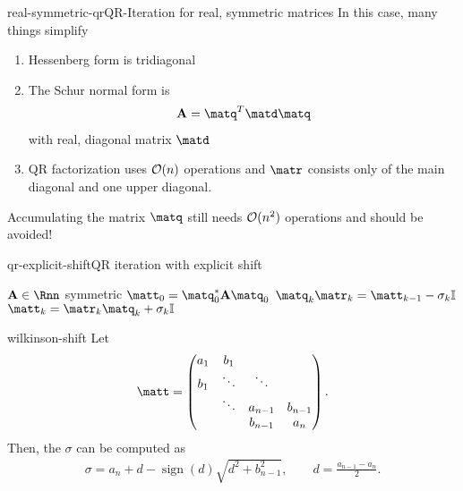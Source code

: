 
\begin{Remark*}{real-symmetric-qr}{QR-Iteration for real, symmetric matrices}
  In this case, many things simplify
  \begin{enumerate}
  \item Hessenberg form is tridiagonal
  \item The Schur normal form is
    \begin{gather}
      \mata = \matq^T\matd\matq
    \end{gather}
    with real, diagonal matrix $\matd$
  \item QR factorization uses $\mathcal O(n)$ operations and $\matr$
    consists only of the main diagonal and one upper diagonal.
  \end{enumerate}
  Accumulating the matrix $\matq$ still needs $\mathcal O(n^2)$ operations and should be avoided!
\end{Remark*}

\begin{Algorithm*}{qr-explicit-shift}{QR iteration with explicit shift}
  \begin{algorithmic}[1]
    \Require $\mata\in\Rnn$ symmetric
    \State $\matt_0 = \matq_0^*\mata\matq_0$
    \State $\matq_k\matr_k = \matt_{k-1} - \sigma_k\id$
    \State $\matt_{k} = \matr_k\matq_k + \sigma_k\id$
    \EndFor
  \end{algorithmic}
\end{Algorithm*}

\begin{Lemma}{wilkinson-shift}
  Let
  \begin{gather}
    \matt =
    \begin{pmatrix}
      a_1&b_1\\
      b_1&\ddots&\ddots\\
      &\ddots&a_{n-1}&b_{n-1}\\
      &&b_{n-1}&a_n
    \end{pmatrix}.
  \end{gather}
  Then, the  $\sigma$ can be computed as
  \begin{gather}
    \sigma = a_n + d - \operatorname{sign}(d) \sqrt{d^2+b_{n-1}^2},
    \qquad d=\frac{a_{n-1}-a_n}2.
  \end{gather}
\end{Lemma}

